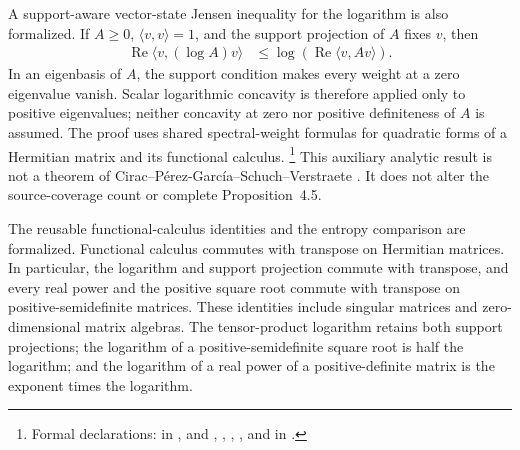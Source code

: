 \documentclass[11pt]{article}
\begin{document}
A support-aware vector-state Jensen inequality for the logarithm is also
formalized. If $A\geq0$, $\langle v,v\rangle=1$, and the support projection of
$A$ fixes $v$, then
\begin{align}
    \operatorname{Re}\langle v,(\log A)v\rangle
        &\leq
        \log\!\left(\operatorname{Re}\langle v,Av\rangle\right).
    \label{eq:cpgsv17_support_log_jensen}
\end{align}
In an eigenbasis of $A$, the support condition makes every weight at a zero
eigenvalue vanish. Scalar logarithmic concavity is therefore applied only to
positive eigenvalues; neither concavity at zero nor positive definiteness of
$A$ is assumed. The proof uses shared spectral-weight formulas for quadratic
forms of a Hermitian matrix and its functional calculus.
\footnote{Formal declarations:
 in
, and
,
,
,
, and
 in
.}
This auxiliary analytic result is not a theorem of
Cirac--P\'erez-Garc\'ia--Schuch--Verstraete
\cite{Cirac2016MPDO_arXiv}. It does not alter the source-coverage count or
complete Proposition~4.5.

The reusable functional-calculus identities and the entropy comparison are
formalized. Functional calculus commutes with transpose on Hermitian matrices.
In particular, the logarithm and support projection commute with transpose,
and every real power and the positive square root commute with transpose on
positive-semidefinite matrices. These identities include singular matrices and
zero-dimensional matrix algebras. The tensor-product logarithm retains both
support projections; the logarithm of a positive-semidefinite square root is
half the logarithm; and the logarithm of a real power of a positive-definite
matrix is the exponent times the logarithm.
\end{document}
